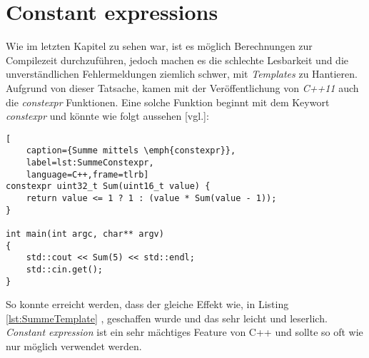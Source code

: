 \section{Constant expressions}\label{sec:constexpr}
Wie im letzten Kapitel \emph{} zu sehen war, ist es möglich Berechnungen
zur Compilezeit durchzuführen, jedoch machen es die schlechte Lesbarkeit und die unverständlichen
Fehlermeldungen ziemlich schwer, mit \emph{Templates} zu Hantieren. Aufgrund von dieser Tatsache,
kamen mit der Veröffentlichung von \emph{C++11} auch die \emph{constexpr} Funktionen. Eine solche
Funktion beginnt mit dem Keywort \emph{constexpr} und könnte wie folgt aussehen
\cite{HandsOn}[vgl.]:

\begin{lstlisting}[
    caption={Summe mittels \emph{constexpr}},
    label=lst:SummeConstexpr,
    language=C++,frame=tlrb]
constexpr uint32_t Sum(uint16_t value) {
	return value <= 1 ? 1 : (value * Sum(value - 1));
}

int main(int argc, char** argv)
{
	std::cout << Sum(5) << std::endl;
	std::cin.get();
}
\end{lstlisting}

So konnte erreicht werden, dass der gleiche Effekt wie, in Listing \ref{lst:SummeTemplate} ,
geschaffen wurde und das sehr leicht und leserlich. \emph{Constant expression} ist ein sehr
mächtiges Feature von C++ und sollte so oft wie nur möglich verwendet werden.